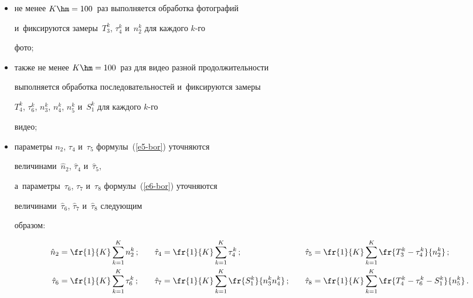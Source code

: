       \begin{itemize}


\item не менее $K\hm = 100$~раз выполняется обработка фотографий 


и~фиксируются замеры~$T_3^k$, $\tau_4^k$ и~$n_2^k$ для каждого $k$-го 


фото;


\item также не менее $K\hm = 100$~раз для видео разной продолжительности 


выполняется обработка последовательностей и~фиксируются замеры 


$T_4^k$, $\tau_6^k$, $n_3^k$, $n_4^k$, $n_5^k$ и~$S_1^k$ для каждого $k$-го 


видео;


\item параметры $n_2$, $\tau_4$ и~$\tau_5$ формулы~(\ref{e5-bor}) уточняются 


величинами~$\hat{n}_2$, $\hat{\tau}_4$ и~$\hat{\tau}_5$, 


а~параметры~$\tau_6$, $\tau_7$ и~$\tau_8$ формулы~(\ref{e6-bor}) уточняются 


величинами~$\hat{\tau}_6$, $\hat{\tau}_7$ и~$\hat{\tau}_8$ следующим 


образом:





\noindent


\begin{alignat*}{3}


\displaystyle\hat{n}_2&=\fr{1}{K}\sum\limits^K_{k=1} n_2^k\,;&\quad


\hat{\tau}_4&=\fr{1}{K}\sum\limits^K_{k=1} \tau_4^k\,;&\quad


\hat{\tau}_5&=\fr{1}{K}\sum\limits^K_{k=1} \fr{T_3^k-\tau_4^k}{n_2^k}\,;\\


\displaystyle\hat{\tau}_6&=\fr{1}{K} \sum\limits^K_{k=1} \tau_6^k\,;&\quad


\hat{\tau}_7&=\fr{1}{K}\sum\limits^K_{k=1} \fr{S_1^k}{n_3^k n_4^k}\,;&\quad


\hat{\tau}_8&=\fr{1}{K}\sum\limits^K_{k=1} \fr{T_4^k -\tau_6^k -


S_1^k}{n_5^k}\,.




\end{alignat*}


      \end{itemize}


